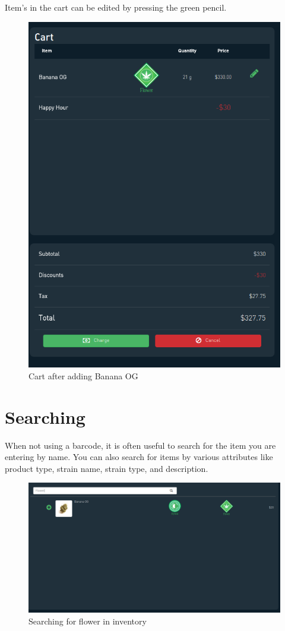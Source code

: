 \documentclass[]{book}
\theoremstyle{definition}
\theoremstyle{definition}
\theoremstyle{definition}
\theoremstyle{remark}
\begin{document}
Item's in the cart can be edited by pressing the green pencil.

\begin{figure}
\centering
\includegraphics{images/P7.png}
\caption{Cart after adding Banana OG}
\end{figure}

\section{Searching}\label{searching}

When not using a barcode, it is often useful to search for the item you
are entering by name. You can also search for items by various
attributes like product type, strain name, strain type, and description.

\begin{figure}
\centering
\includegraphics{images/P8.png}
\caption{Searching for flower in inventory}
\end{figure}
\end{document}
